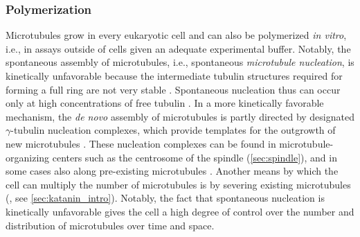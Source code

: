 \subsubsection{Polymerization}
\label{sec:instability}
Microtubules grow in every eukaryotic cell and can also be polymerized \textit{in vitro}, i.e., in assays outside of cells given an adequate experimental buffer. Notably, the spontaneous assembly of microtubules, i.e., spontaneous \textit{microtubule nucleation}, is kinetically unfavorable because the intermediate tubulin structures required for forming a full ring are not very stable \parencite{Akhmanova2022}. Spontaneous nucleation thus can occur only at high concentrations of free tubulin \parencite{Fygenson1994}. In a more kinetically favorable mechanism, the \textit{de novo} assembly of microtubules is partly directed by designated $\gamma$-tubulin nucleation complexes, which provide templates for the outgrowth of new microtubules \parencite{Akhmanova2022}. These nucleation complexes can be found in microtubule-organizing centers such as the centrosome of the spindle (\autoref{sec:spindle}), and in some cases also along pre-existing microtubules \parencite{Akhmanova2022, Janson2007}. Another means by which the cell can multiply the number of microtubules is by severing existing microtubules (\cite{Vemu2018}, see \autoref{sec:katanin_intro}). Notably, the fact that spontaneous nucleation is kinetically unfavorable gives the cell a high degree of control over the number and distribution of microtubules over time and space. \par

